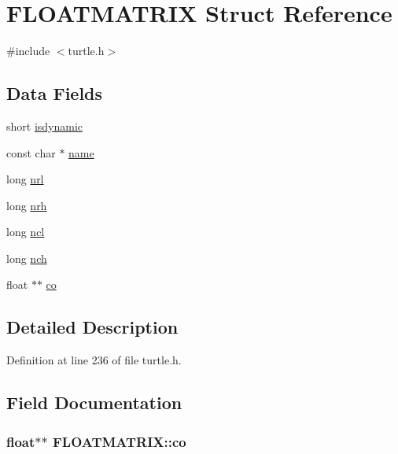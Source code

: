 \hypertarget{struct_f_l_o_a_t_m_a_t_r_i_x}{\section{F\-L\-O\-A\-T\-M\-A\-T\-R\-I\-X Struct Reference}
\label{struct_f_l_o_a_t_m_a_t_r_i_x}
}


{\ttfamily \#include $<$turtle.\-h$>$}

\subsection*{Data Fields}
\begin{DoxyCompactItemize}
\item 
short \hyperlink{struct_f_l_o_a_t_m_a_t_r_i_x_ae4b139ff9c3027f34ed485e2541aabb3}{isdynamic}
\item 
const char $\ast$ \hyperlink{struct_f_l_o_a_t_m_a_t_r_i_x_ab82fb414421032903bd15335e35fa892}{name}
\item 
long \hyperlink{struct_f_l_o_a_t_m_a_t_r_i_x_af584286f711f52f38aeddb934fe43df3}{nrl}
\item 
long \hyperlink{struct_f_l_o_a_t_m_a_t_r_i_x_afba4e3aef87b699e1062cf46a319ffc6}{nrh}
\item 
long \hyperlink{struct_f_l_o_a_t_m_a_t_r_i_x_a07af39607f22f0440475905f48d840a8}{ncl}
\item 
long \hyperlink{struct_f_l_o_a_t_m_a_t_r_i_x_a0c60488f3e973ff5d5bed48ae0c081f8}{nch}
\item 
float $\ast$$\ast$ \hyperlink{struct_f_l_o_a_t_m_a_t_r_i_x_a09b2b8353341aa425a3fd028bb52b427}{co}
\end{DoxyCompactItemize}


\subsection{Detailed Description}


Definition at line 236 of file turtle.\-h.



\subsection{Field Documentation}
\hypertarget{struct_f_l_o_a_t_m_a_t_r_i_x_a09b2b8353341aa425a3fd028bb52b427}{
\subsubsection[{co}]{\setlength{\rightskip}{0pt plus 5cm}float$\ast$$\ast$ F\-L\-O\-A\-T\-M\-A\-T\-R\-I\-X\-::co}}\label{struct_f_l_o_a_t_m_a_t_r_i_x_a09b2b8353341aa425a3fd028bb52b427}


